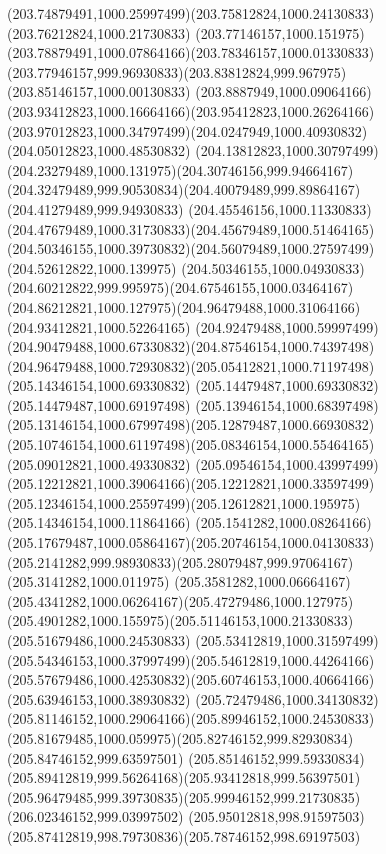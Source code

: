 {{		\curveto(203.74879491,1000.25997499)(203.75812824,1000.24130833)(203.76212824,1000.21730833)
		\curveto(203.77146157,1000.151975)(203.78879491,1000.07864166)(203.78346157,1000.01330833)
		\curveto(203.77946157,999.96930833)(203.83812824,999.967975)(203.85146157,1000.00130833)
		\curveto(203.8887949,1000.09064166)(203.93412823,1000.16664166)(203.95412823,1000.26264166)
		\curveto(203.97012823,1000.34797499)(204.0247949,1000.40930832)(204.05012823,1000.48530832)
		\curveto(204.13812823,1000.30797499)(204.23279489,1000.131975)(204.30746156,999.94664167)
		\curveto(204.32479489,999.90530834)(204.40079489,999.89864167)(204.41279489,999.94930833)
		\curveto(204.45546156,1000.11330833)(204.47679489,1000.31730833)(204.45679489,1000.51464165)
		\curveto(204.50346155,1000.39730832)(204.56079489,1000.27597499)(204.52612822,1000.139975)
		\curveto(204.50346155,1000.04930833)(204.60212822,999.995975)(204.67546155,1000.03464167)
		\curveto(204.86212821,1000.127975)(204.96479488,1000.31064166)(204.93412821,1000.52264165)
		\curveto(204.92479488,1000.59997499)(204.90479488,1000.67330832)(204.87546154,1000.74397498)
		\curveto(204.96479488,1000.72930832)(205.05412821,1000.71197498)(205.14346154,1000.69330832)
		\lineto(205.14479487,1000.69330832)
		\lineto(205.14479487,1000.69197498)
		\curveto(205.13946154,1000.68397498)(205.13146154,1000.67997498)(205.12879487,1000.66930832)
		\curveto(205.10746154,1000.61197498)(205.08346154,1000.55464165)(205.09012821,1000.49330832)
		\curveto(205.09546154,1000.43997499)(205.12212821,1000.39064166)(205.12212821,1000.33597499)
		\curveto(205.12346154,1000.25597499)(205.12612821,1000.195975)(205.14346154,1000.11864166)
		\curveto(205.1541282,1000.08264166)(205.17679487,1000.05864167)(205.20746154,1000.04130833)
		\curveto(205.2141282,999.98930833)(205.28079487,999.97064167)(205.3141282,1000.011975)
		\curveto(205.3581282,1000.06664167)(205.4341282,1000.06264167)(205.47279486,1000.127975)
		\curveto(205.4901282,1000.155975)(205.51146153,1000.21330833)(205.51679486,1000.24530833)
		\curveto(205.53412819,1000.31597499)(205.54346153,1000.37997499)(205.54612819,1000.44264166)
		\curveto(205.57679486,1000.42530832)(205.60746153,1000.40664166)(205.63946153,1000.38930832)
		\curveto(205.72479486,1000.34130832)(205.81146152,1000.29064166)(205.89946152,1000.24530833)
		\curveto(205.81679485,1000.059975)(205.82746152,999.82930834)(205.84746152,999.63597501)
		\curveto(205.85146152,999.59330834)(205.89412819,999.56264168)(205.93412818,999.56397501)
		\curveto(205.96479485,999.39730835)(205.99946152,999.21730835)(206.02346152,999.03997502)
		\curveto(205.95012818,998.91597503)(205.87412819,998.79730836)(205.78746152,998.69197503)
}}
